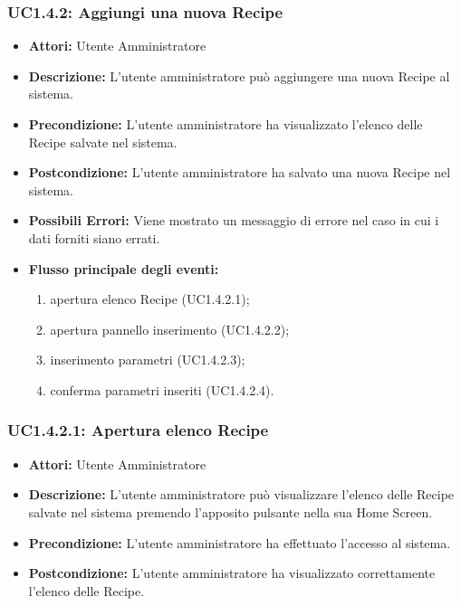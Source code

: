 \subsubsection{UC1.4.2: Aggiungi una nuova Recipe}

\begin{itemize}
    \item \textbf{Attori:} Utente Amministratore
    \item \textbf{Descrizione:} L'utente amministratore può aggiungere una nuova Recipe al sistema.
    \item \textbf{Precondizione:} L'utente amministratore ha visualizzato l'elenco delle Recipe salvate nel sistema.
    \item \textbf{Postcondizione:} L'utente amministratore ha salvato una nuova Recipe nel sistema.
	\item \textbf{Possibili Errori:}
    Viene mostrato un messaggio di errore nel caso in cui i dati forniti siano errati.
    \item \textbf{Flusso principale degli eventi:}

    \begin{enumerate}
        \item apertura elenco Recipe (UC1.4.2.1);
        \item apertura pannello inserimento (UC1.4.2.2);
        \item inserimento parametri (UC1.4.2.3);
        \item conferma parametri inseriti (UC1.4.2.4).
    \end{enumerate}

\end{itemize}

\subsubsection{UC1.4.2.1: Apertura elenco Recipe}

\begin{itemize}
    \item \textbf{Attori:} Utente Amministratore
    \item \textbf{Descrizione:} L'utente amministratore può visualizzare l'elenco delle Recipe salvate nel sistema premendo l'apposito pulsante nella sua Home Screen.
    \item \textbf{Precondizione:} L'utente amministratore ha effettuato l'accesso al sistema.
    \item \textbf{Postcondizione:} L'utente amministratore ha visualizzato correttamente l'elenco delle Recipe.
\end{itemize}

